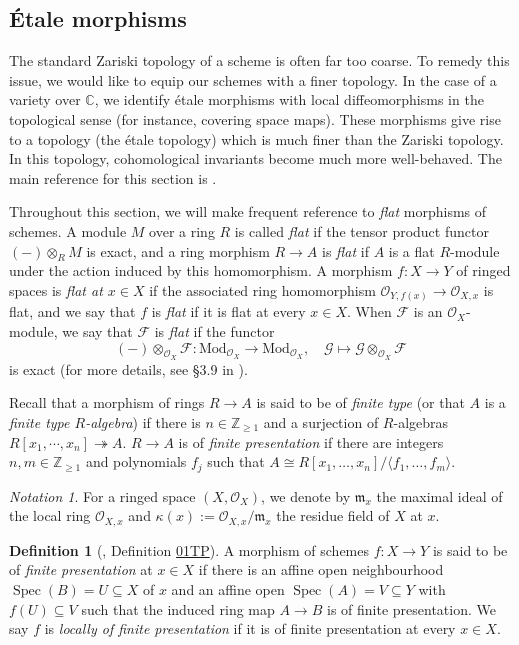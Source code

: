 \documentclass{article}
\def\~#1{\mathscr{#1}}
\numberwithin{equation}{section}
\numberwithin{figure}{section}
\newcommand{\C}{\mathbb{C}}
\newcommand{\Z}{\mathbb{Z}}
\newcommand{\epi}{\twoheadrightarrow}
\newcommand{\Spec}{\mathop{\mathrm{Spec}}}
\renewcommand{\frak}[1]{\mathfrak{#1}}
\newcommand{\Mod}{\mathrm{Mod}}
\theoremstyle{plain}
\theoremstyle{definition}
\newtheorem{defn}[thm]{Definition}
\theoremstyle{remark}
\newtheorem*{notation}{Notation}
\begin{document}
\subsection{\'Etale morphisms}
The standard Zariski topology of a scheme is often far too coarse. To remedy this issue, we would like to equip our schemes with a finer topology. In the case of a variety over $\C$, we identify \'etale morphisms with local diffeomorphisms in the topological sense (for instance, covering space maps). These morphisms give rise to a topology (the \'etale topology) which is much finer than the Zariski topology. In this topology, cohomological invariants become much more well-behaved. The main reference for this section is \cite{stacks}.

Throughout this section, we will make frequent reference to \emph{flat} morphisms of schemes. A module $M$ over a ring $R$ is called \emph{flat} if the tensor product functor $(-)\otimes_R M$ is exact, and a ring morphism $R \to A$ is \emph{flat} if $A$ is a flat $R$-module under the action induced by this homomorphism. A morphism $f: X \to Y$ of ringed spaces is \emph{flat at $x \in X$} if the associated ring homomorphism $\~O_{Y, f(x)} \to \~O_{X, x}$ is flat, and we say that $f$ is \emph{flat} if it is flat at every $x \in X$. When $\~F$ is an $\~O_X$-module, we say that $\~F$ is \emph{flat} if the functor 
\[
   (-)\otimes_{\~O_X}\~F: \Mod_{\~O_X} \to \Mod_{\~O_X}, \quad \~G \mapsto \~G \otimes_{\~O_X} \~F
\]
is exact (for more details, see \S3.9 in \cite{hartshorne}). 

Recall that a morphism of rings $R \to A$ is said to be of \emph{finite type} (or that $A$ is a \emph{finite type $R$-algebra}) if there is $n \in \Z_{\ge 1}$ and a surjection of $R$-algebras $R[x_1, \cdots, x_n] \epi A$. $R \to A$ is of \emph{finite presentation} if there are integers $n, m \in \Z_{\ge 1}$ and polynomials $f_j$ such that $A \cong R[x_1, \hdots, x_n]/\langle f_1, \hdots, f_m \rangle$.

\begin{notation}
    For a ringed space $(X, \~O_X)$, we denote by $\frak{m}_x$ the maximal ideal of the local ring $\~O_{X,x}$ and $\kappa(x) := \~O_{X,x}/\frak{m}_x$ the residue field of $X$ at $x$.
\end{notation}

\begin{defn}[\cite{stacks}, Definition \href{https://stacks.math.columbia.edu/tag/01TP}{01TP}]
    A morphism of schemes $f: X \to Y$ is said to be of \emph{finite presentation} at $x \in X$ if there is an affine open neighbourhood $\Spec(B) = U \subseteq X$ of $x$ and an affine open $\Spec(A) = V \subseteq Y$ with $f(U) \subseteq V$ such that the induced ring map $A \to B$ is of finite presentation. We say $f$ is \emph{locally of finite presentation} if it is of finite presentation at every $x \in X$.
\end{defn}
\end{document}
